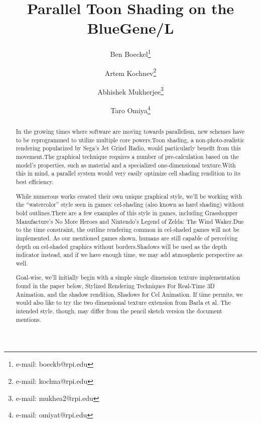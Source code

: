 \documentclass{acmsiggraph}
\title{Parallel Toon Shading on the BlueGene/L}
\author{%
Ben Boeckel\thanks{e-mail: boeckb@rpi.edu} %
\and Artem Kochnev\thanks{e-mail: kochna@rpi.edu} %
\and Abhishek Mukherjee\thanks{e-mail: mukhea2@rpi.edu} %
\and Taro Omiya\thanks{e-mail: omiyat@rpi.edu}}
\begin{document}
\maketitle

\begin{abstract}

In the growing times where software are moving towards parallelism, new schemes
have to be reprogrammed to utilize multiple core powers.Toon shading, a
non-photo-realistic rendering popularized by Sega's Jet Grind Radio, would
particularly benefit from this movement.The graphical technique requires a
number of pre-calculation based on the model's properties, such as material and
a specialized one-dimensional texture.With this in mind, a parallel system
would very easily optimize cell shading rendition to its best efficiency.

While numerous works created their own unique graphical style, we'll be working
with the ``watercolor'' style seen in games: cel-shading (also known as hard
shading) without bold outlines.There are a few examples of this style in
games, including Grasshopper Manufacture's No More Heroes and Nintendo's Legend
of Zelda: The Wind Waker.Due to the time constraint, the outline rendering
common in cel-shaded games will not be implemented. As our mentioned games
shown, humans are still capable of perceiving depth on cel-shaded graphics
without borders.Shadows will be used as the depth indicator instead, and if
we have enough time, we may add atmospheric perspective as well.

Goal-wise, we'll initially begin with a simple single dimension texture
implementation found in the paper below, Stylized Rendering Techniques For
Real-Time 3D Animation, and the shadow rendition, Shadows for Cel Animation.
If time permits, we would also like to try the two dimensional texture
extension from Barla et al. The intended style, though,
may differ from the pencil sketch version the document mentions.

\end{abstract}


\end{document}
